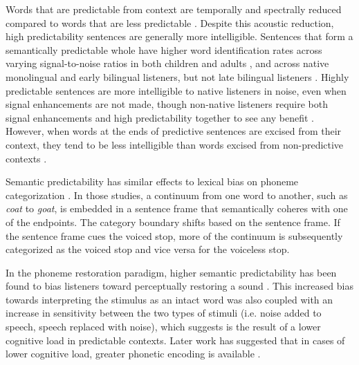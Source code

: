 Words that are predictable from context are temporally and spectrally reduced compared to words that are less predictable \citep{Scarborough2010, Clopper2008}. 
Despite this acoustic reduction, high predictability sentences are generally more intelligible.
Sentences that form a semantically predictable whole have higher word identification rates across varying signal-to-noise ratios \citep{Kalikow1977} in both children and adults \citep{Fallon2002}, and across native monolingual and early bilingual listeners, but not late bilingual listeners \citep{Mayo1997}.
Highly predictable sentences are more intelligible to native listeners in noise, even when signal enhancements are not made, though non-native listeners require both signal enhancements and high predictability together to see any benefit \citep{Bradlow2007}.
However, when words at the ends of predictive sentences are excised from their context, they tend to be less intelligible than words excised from non-predictive contexts \citep{Lieberman1963}.

Semantic predictability has similar effects to lexical bias on phoneme categorization \citep{Connine1987, Borsky1998}.  
In those studies, a continuum from one word to another, such as \emph{coat} to \emph{goat}, is embedded in a sentence frame that semantically coheres with one of the endpoints.  
The category boundary shifts based on the sentence frame.
If the sentence frame cues the voiced stop, more of the continuum is subsequently categorized as the voiced stop and vice versa for the voiceless stop.

In the phoneme restoration paradigm, higher semantic predictability has been found to bias listeners toward perceptually restoring a sound \citep{Samuel1981}.
This increased bias towards interpreting the stimulus as an intact word was also coupled with an increase in sensitivity between the two types of stimuli (i.e. noise added to speech, speech replaced with noise), which \citet{Samuel1981} suggests is the result of a lower cognitive load in predictable contexts. Later work has suggested that in cases of lower cognitive load, greater phonetic encoding is available \citep[see also][]{Mattys2011}.

